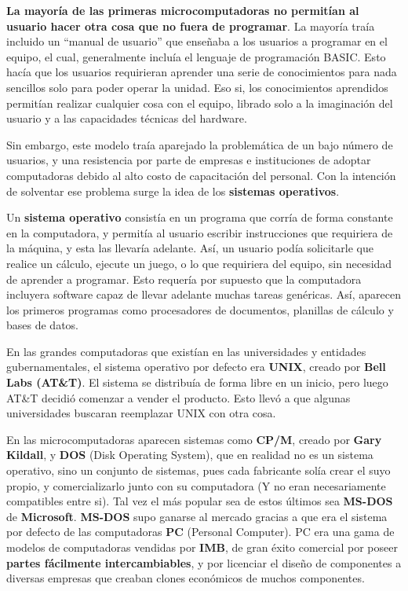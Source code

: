 \textbf{La mayoría de las primeras microcomputadoras no permitían al usuario hacer
otra cosa que no fuera de programar}. La mayoría traía incluido un ``manual de
usuario'' que enseñaba a los usuarios a programar en el equipo, el cual,
generalmente incluía el lenguaje de programación BASIC. Esto hacía que
los usuarios requirieran aprender una serie de conocimientos para nada sencillos
solo para poder operar la unidad. Eso si, los conocimientos aprendidos permitían
realizar cualquier cosa con el equipo, librado solo a la imaginación del usuario
y a las capacidades técnicas del hardware.

Sin embargo, este modelo traía aparejado la problemática de un bajo número de
usuarios, y una resistencia por parte de empresas e instituciones de adoptar
computadoras debido al alto costo de capacitación del personal. Con la
intención de solventar ese problema surge la idea de los \textbf{sistemas operativos}.

Un \textbf{sistema operativo} consistía en un programa que corría de forma constante
en la computadora, y permitía al usuario escribir instrucciones que requiriera
de la máquina, y esta las llevaría adelante. Así, un usuario podía solicitarle
que realice un cálculo, ejecute un juego, o lo que requiriera del equipo, sin
necesidad de aprender a programar. Esto requería por supuesto que la computadora
incluyera software capaz de llevar adelante muchas tareas genéricas. Así, aparecen
los primeros programas como procesadores de documentos, planillas de cálculo y
bases de datos.\autocite[cap. 3]{ceruzzi_2003}

En las grandes computadoras que existían en las universidades y entidades
gubernamentales, el sistema operativo por defecto era \textbf{UNIX}, creado
por \textbf{Bell Labs (AT\&T)}. El sistema se distribuía de forma libre en
un inicio, pero luego AT\&T decidió comenzar a vender el producto. Esto llevó a
que algunas universidades buscaran reemplazar UNIX con otra cosa.

En las microcomputadoras aparecen sistemas como \textbf{CP/M}, creado por
\textbf{Gary Kildall}, y \textbf{DOS} (Disk Operating System), que en realidad
no es un sistema operativo, sino un conjunto de sistemas, pues cada fabricante solía
crear el suyo propio, y comercializarlo junto con su computadora (Y no eran
necesariamente compatibles entre si). Tal vez el más popular sea de estos últimos
sea \textbf{MS-DOS} de \textbf{Microsoft}. \textbf{MS-DOS} supo
ganarse al mercado gracias a que era el sistema por defecto de las computadoras
\textbf{PC} (Personal Computer). PC era una gama de modelos de computadoras vendidas
por \textbf{IMB}, de gran éxito comercial por poseer \textbf{partes fácilmente
intercambiables}, y por licenciar el diseño de componentes a diversas empresas
que creaban clones económicos de muchos componentes.

